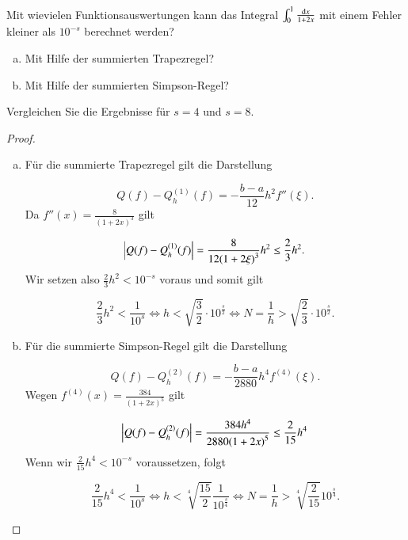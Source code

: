 
\begin{exercise}
  Mit wievielen Funktionsauswertungen kann das Integral $\int_0^1{\frac{\dif x}{1+2x}}$ mit einem Fehler kleiner als $10^{-s}$ berechnet werden?

  \begin{enumerate}[(a)]
  \item Mit Hilfe der summierten Trapezregel?
  \item Mit Hilfe der summierten Simpson-Regel?
  \end{enumerate}
  Vergleichen Sie die Ergebnisse für $s=4$ und $s=8$.
\end{exercise}
\begin{proof}
  \begin{enumerate}[(a)]
  \item Für die summierte Trapezregel gilt die Darstellung

    \begin{equation*}
      Q(f)-Q_h^{(1)}(f)=-\frac{b-a}{12}h^2 f''(\xi).
    \end{equation*}
    Da $f''(x)=\frac{8}{{(1+2x)}^3}$ gilt

    \begin{equation*}
      \abs{Q(f)-Q_h^{(1)}(f)}=\frac{8}{12{(1+2\xi)}^3}h^2 \leq \frac{2}{3}h^2.
    \end{equation*}
    Wir setzen also $\frac{2}{3}h^2 < 10^{-s}$ voraus und somit gilt

    \begin{equation*}
      \frac{2}{3}h^2 < \frac{1}{10^s} \iff h < \sqrt{\frac{3}{2}} \cdot 10^{\frac{s}{2}} \iff N=\frac{1}{h} > \sqrt{\frac{2}{3}} \cdot 10^{\frac{s}{2}}.
    \end{equation*}
  \item Für die summierte Simpson-Regel gilt die Darstellung

    \begin{equation*}
       Q(f)-Q_h^{(2)}(f)=-\frac{b-a}{2880}h^4 f^{(4)}(\xi).
    \end{equation*}
    Wegen $f^{(4)}(x)=\frac{384}{{(1+2x)}^5}$ gilt

    \begin{equation*}
      \abs{Q(f)-Q_h^{(2)}(f)}=\frac{384 h^4}{2880{(1+2x)}^5} \leq \frac{2}{15}h^4
    \end{equation*}
    Wenn wir $\frac{2}{15}h^4 < 10^{-s}$ voraussetzen, folgt

    \begin{equation*}
      \frac{2}{15}h^4 < \frac{1}{10^s} \iff h < \sqrt[4]{\frac{15}{2}}\frac{1}{10^{\frac{s}{4}}} \iff N=\frac{1}{h} > \sqrt[4]{\frac{2}{15}}10^{\frac{s}{4}}.
    \end{equation*}
  \end{enumerate}


\end{proof}
